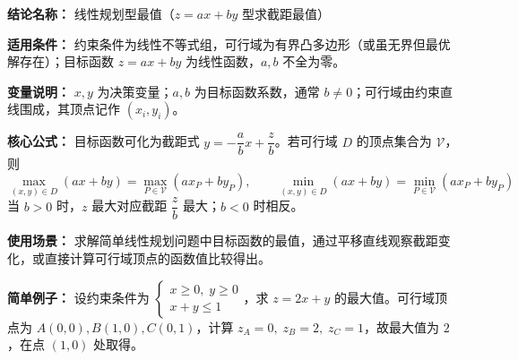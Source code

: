 \textbf{结论名称：} 线性规划型最值（\(z=ax+by\) 型求截距最值）

\textbf{适用条件：} 约束条件为线性不等式组，可行域为有界凸多边形（或虽无界但最优解存在）；目标函数 \(z=ax+by\) 为线性函数，\(a,b\) 不全为零。

\textbf{变量说明：} \(x,y\) 为决策变量；\(a,b\) 为目标函数系数，通常 \(b\neq0\)；可行域由约束直线围成，其顶点记作 \((x_i,y_i)\)。

\textbf{核心公式：} 目标函数可化为截距式 \(y=-\dfrac{a}{b}x+\dfrac{z}{b}\)。若可行域 \(D\) 的顶点集合为 \(\mathcal{V}\)，则
\[
\boxed{\max_{(x,y)\in D}(ax+by)=\max_{P\in\mathcal{V}}(ax_P+by_P),\qquad 
\min_{(x,y)\in D}(ax+by)=\min_{P\in\mathcal{V}}(ax_P+by_P)}
\]
当 \(b>0\) 时，\(z\) 最大对应截距 \(\dfrac{z}{b}\) 最大；\(b<0\) 时相反。

\textbf{使用场景：} 求解简单线性规划问题中目标函数的最值，通过平移直线观察截距变化，或直接计算可行域顶点的函数值比较得出。

\textbf{简单例子：} 设约束条件为 \(\begin{cases} x\ge0,\; y\ge0\\ x+y\le1 \end{cases}\)，求 \(z=2x+y\) 的最大值。可行域顶点为 \(A(0,0), B(1,0), C(0,1)\)，计算 \(z_A=0,\;z_B=2,\;z_C=1\)，故最大值为 \(2\)，在点 \((1,0)\) 处取得。